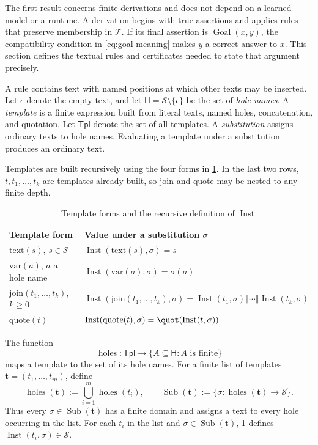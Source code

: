 \documentclass[11pt,twoside]{article}
\theoremstyle{definition}
\newcommand{\Stext}{\mathcal S}
\newcommand{\True}{\mathcal T}
\newcommand{\Tpl}{\mathsf{Tpl}}
\newcommand{\Goal}{\operatorname{Goal}}
\newcommand{\Inst}{\operatorname{Inst}}
\newcommand{\Subs}{\operatorname{Sub}}
\newcommand{\cat}{\mathbin{\Vert}}
\begin{document}
The first result concerns finite derivations and does not depend on a learned
model or a runtime. A derivation begins with true assertions and applies rules
that preserve membership in $\True$. If its final assertion is
$\Goal(x,y)$, the compatibility condition in \cref{eq:goal-meaning} makes
$y$ a correct answer to $x$. This section defines the textual rules and
certificates needed to state that argument precisely.

A rule contains text with named positions at which other texts may be
inserted. Let $\epsilon$ denote the empty text, and let
$\mathsf H=\Stext\setminus\{\epsilon\}$ be the set of \emph{hole names}. A
\emph{template} is a finite expression built from literal texts, named holes,
concatenation, and quotation. Let $\Tpl$ denote the set of all templates. A
\emph{substitution} assigns ordinary texts to hole names.
Evaluating a template under a substitution produces an ordinary text.

Templates are built recursively using the four forms in
\cref{tab:template-instantiation}.
In the last two rows, $t,t_1,\ldots,t_k$ are templates already built, so
\textup{join} and \textup{quote} may be nested to any finite depth.
\begin{table}[ht]
\centering
\caption{Template forms and the recursive definition of $\Inst$}
\label{tab:template-instantiation}
\begin{tabular}{ll}
\toprule
Template form & Value under a substitution $\sigma$\\
\midrule
$\mathrm{text}(s)$, $s\in\Stext$ & $\Inst(\mathrm{text}(s),\sigma)=s$\\
$\mathrm{var}(a)$, $a$ a hole name & $\Inst(\mathrm{var}(a),\sigma)=\sigma(a)$\\
$\mathrm{join}(t_1,\ldots,t_k)$, $k\geq 0$
  & $\Inst(\mathrm{join}(t_1,\ldots,t_k),\sigma)
     =\Inst(t_1,\sigma)\cat\cdots\cat\Inst(t_k,\sigma)$\\
$\mathrm{quote}(t)$ & $\Inst(\mathrm{quote}(t),\sigma)=\quot(\Inst(t,\sigma))$\\
\bottomrule
\end{tabular}
\end{table}
The function
\[
 \operatorname{holes}:\Tpl\longrightarrow
 \{A\subseteq\mathsf H:A\text{ is finite}\}
\]
maps a template to the set of its hole names. For a finite list of templates
$\mathbf t=(t_1,\ldots,t_m)$, define
\[
 \operatorname{holes}(\mathbf t)
 :=\bigcup_{i=1}^m\operatorname{holes}(t_i),
 \qquad
 \Subs(\mathbf t)
 :=\{\sigma:\operatorname{holes}(\mathbf t)\to\Stext\}.
\]
Thus every $\sigma\in\Subs(\mathbf t)$ has a finite domain and assigns a text
to every hole occurring in the list. For each $t_i$ in the list and
$\sigma\in\Subs(\mathbf t)$, \cref{tab:template-instantiation} defines
$\Inst(t_i,\sigma)\in\Stext$.
\end{document}
